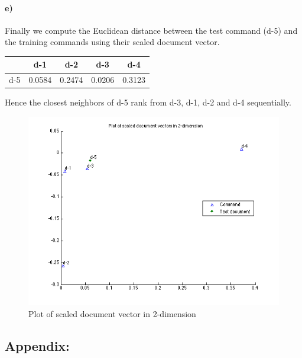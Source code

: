 \documentclass[a4paper]{article}
\begin{document}
\paragraph{e)} Finally we compute the Euclidean distance between the test command (d-5) and the training commands using their scaled document vector.

\begin{center}
    \begin{tabular}{ |c |c |c |c |c | }
      \hline
       & d-1 & d-2 & d-3 & d-4 \\ \hline
      d-5 &     0.0584  &  0.2474  &  0.0206 &   0.3123 \\ \hline
    \end{tabular}
\end{center}

Hence the closest neighbors of d-5 rank from d-3, d-1, d-2 and d-4 sequentially.

  \begin{figure}[H]
    \centering
      \includegraphics[scale=.57]{images/doc_vecs.png}
    \caption{Plot of scaled document vector in 2-dimension}
  \end{figure}

\newpage
\subsection*{Appendix:}
	
	
	
	
	
	
	
	
\end{document}
